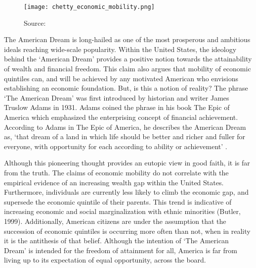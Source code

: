 
\begin{figure}
    \caption{Source: \cite{opportunityinsights}}
    \texttt{[image: chetty\_economic\_mobility.png]}
    \label{fig1}
\end{figure}

The American Dream is long-hailed as one of the most prosperous and ambitious ideals reaching wide-scale popularity. Within the United States, the ideology behind the `American Dream' provides a positive notion towards the attainability of wealth and financial freedom. 
This claim also argues that mobility of economic quintiles can, and will be achieved by any motivated American who envisions establishing an economic foundation. But, is this a notion of reality? 
The phrase `The American Dream' was first introduced by historian and writer James Truslow Adams in 1931. Adams coined the phrase in his book The Epic of America which emphasized the enterprising concept of financial achievement. 
According to Adams in The Epic of America, he describes the American Dream as, `that dream of a land in which life should be better and richer and fuller for everyone, with opportunity for each according to ability or achievement' \parencite{adams2017}.


Although this pioneering thought provides an eutopic view in good faith, it is far from the truth.  
The claims of economic mobility do not correlate with the empirical evidence of an increasing wealth gap within the United States. Furthermore, individuals are currently less likely to climb the economic gap, and supersede the economic quintile of their parents. 
This trend is indicative of increasing economic and social marginalization with ethnic minorities (Butler, 1999).
Additionally, American citizens are under the assumption that the succession of economic quintiles is occurring more often than not, when in reality it is the antithesis of that belief. 
Although the intention of `The American Dream' is intended for the freedom of attainment for all, America is far from living up to its expectation of equal opportunity, across the board.  






